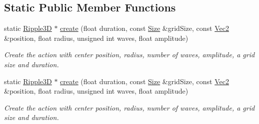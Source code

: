 \subsection*{Static Public Member Functions}
\begin{DoxyCompactItemize}
\item 
static \hyperlink{classRipple3D}{Ripple3D} $\ast$ \hyperlink{classRipple3D_aec108464938f4d1f2ad5147be691ccbb}{create} (float duration, const \hyperlink{classSize}{Size} \&grid\+Size, const \hyperlink{classVec2}{Vec2} \&position, float radius, unsigned int waves, float amplitude)
\begin{DoxyCompactList}\small\item\em Create the action with center position, radius, number of waves, amplitude, a grid size and duration. \end{DoxyCompactList}\item 
static \hyperlink{classRipple3D}{Ripple3D} $\ast$ \hyperlink{classRipple3D_aa3de4a3451cef0b10635db29a02e35a8}{create} (float duration, const \hyperlink{classSize}{Size} \&grid\+Size, const \hyperlink{classVec2}{Vec2} \&position, float radius, unsigned int waves, float amplitude)
\begin{DoxyCompactList}\small\item\em Create the action with center position, radius, number of waves, amplitude, a grid size and duration. \end{DoxyCompactList}\end{DoxyCompactItemize}
